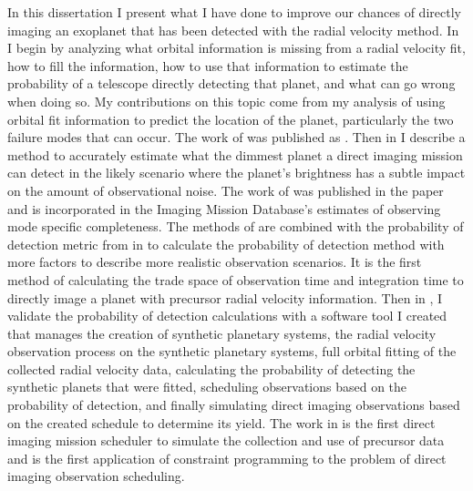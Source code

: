 In this dissertation I present what I have done to improve our chances of
directly imaging an exoplanet that has been detected with the radial velocity
method. In  I begin by analyzing what orbital information
is missing from a radial velocity fit, how to fill the information, how to use
that information to estimate the probability of a telescope directly detecting
that planet, and what can go wrong when doing so. My contributions on this
topic come from my analysis of using orbital fit information to predict the
location of the planet, particularly the two failure modes that can occur. The
work of  was published as
\citet{spohnSchedulingDirect2022}. Then in  I describe a
method to accurately estimate what the dimmest planet a direct imaging mission
can detect in the likely scenario where the planet's brightness has a subtle
impact on the amount of observational noise. The work of 
was published in the paper \citet{spohnDirectImaging2022} and is incorporated
in the Imaging Mission Database's \citep{savranskyExplorationDynamical2019}
estimates of observing mode specific completeness. The methods of
 are combined with the probability of detection metric from
 in  to calculate the probability
of detection method with more factors to describe more realistic observation
scenarios. It is the first method of calculating the trade space of observation
time and integration time to directly image a planet with precursor radial
velocity information. Then in , I validate the
probability of detection calculations with a software tool I created that
manages the creation of synthetic planetary systems, the radial velocity
observation process on the synthetic planetary systems, full orbital fitting of
the collected radial velocity data, calculating the probability of detecting
the synthetic planets that were fitted, scheduling observations based on the
probability of detection, and finally simulating direct imaging observations
based on the created schedule to determine its yield. The work in
 is the first direct imaging mission scheduler to
simulate the collection and use of precursor data and is the first application
of constraint programming to the problem of direct imaging observation
scheduling.
